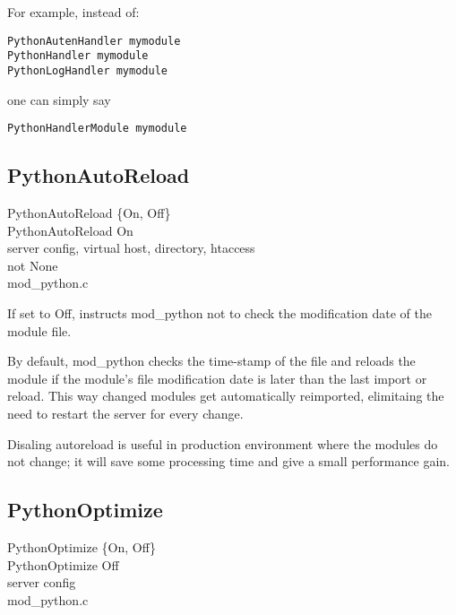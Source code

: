 For example, instead of:
\begin{verbatim}
PythonAutenHandler mymodule
PythonHandler mymodule
PythonLogHandler mymodule
\end{verbatim}    

one can simply say
\begin{verbatim}
PythonHandlerModule mymodule
\end{verbatim}    

\subsection{PythonAutoReload\label{dir-other-par}}

PythonAutoReload \{On, Off\} \\
PythonAutoReload On\\
server config, virtual host, directory, htaccess\\
not None\\
mod_python.c

If set to Off, instructs mod_python not to check the modification date
of the module file. 

By default, mod_python checks the time-stamp of the file and reloads
the module if the module's file modification date is later than the
last import or reload. This way changed modules get automatically
reimported, elimitaing the need to restart the server for every
change.

Disaling autoreload is useful in production environment where the
modules do not change; it will save some processing time and give a
small performance gain.

\subsection{PythonOptimize\label{dir-other-pomz}}

PythonOptimize \{On, Off\} \\
PythonOptimize Off\\
server config\\
mod_python.c

